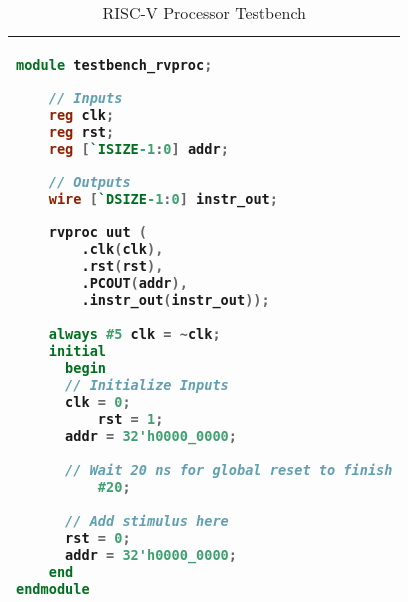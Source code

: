 \lstset{framesep=-10pt, xleftmargin=-10pt}

\begin{table}[!h]
\centering
\caption{RISC-V Processor Testbench}
\label{riscvcode1:tb}
\begin{tabular}{l}
\toprule
\begin{lstlisting}[columns=fullflexible, language=Verilog]
module testbench_rvproc;

	// Inputs
	reg clk;
	reg rst;
	reg [`ISIZE-1:0] addr; 

	// Outputs
	wire [`DSIZE-1:0] instr_out;

	rvproc uut (
		.clk(clk), 
		.rst(rst), 
		.PCOUT(addr), 
		.instr_out(instr_out));
        
	always #5 clk = ~clk;
	initial 
	  begin
	  // Initialize Inputs
	  clk = 0;
          rst = 1;
	  addr = 32'h0000_0000;
      
	  // Wait 20 ns for global reset to finish
          #20;
          
	  // Add stimulus here
	  rst = 0;
	  addr = 32'h0000_0000;
	end	
endmodule
\end{lstlisting}
\\
\bottomrule
\end{tabular}
\end{table}

